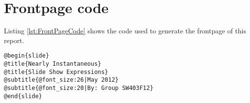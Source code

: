 \section{Frontpage code}
\label{AFrontPageCode}
Listing \ref{lst:FrontPageCode} shows the code used to generate the frontpage of this report.

\begin{lstlisting}[frame=single,caption=NISSE code generating the frontpage, label=lst:FrontPageCode]
@begin{slide}
@title{Nearly Instantaneous}
@title{Slide Show Expressions}
@subtitle{@font_size:26|May 2012}
@subtitle{@font_size:20|By: Group SW403F12}
@end{slide}
\end{lstlisting}